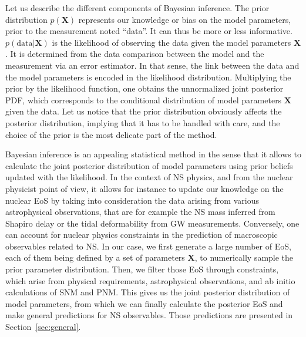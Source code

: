 Let us describe the different components of Bayesian inference. The 
prior distribution $p(\bm{X})$ represents our knowledge or bias on the 
model parameters, prior to the measurement noted ``data''. It can thus be more 
or less informative.
$p(\text{data}|\bm{X})$ is the likelihood of observing the data given the model
parameters $\bm{X}$. It is determined from the data comparison between the 
model and the measurement via an error estimator. In that sense, the link 
between the data and the model parameters is encoded in the likelihood
distribution. 
Multiplying the prior by the likelihood function, one obtains the unnormalized 
joint posterior PDF, which corresponds to the conditional distribution of 
model parameters $\bm{X}$ given the data. Let us notice that the prior 
distribution obviously affects the posterior distribution, implying that it has
to be handled with care, and the choice of the prior is the most delicate part
of the method. 

Bayesian inference is an appealing statistical method in the sense that it 
allows to calculate the joint posterior distribution of model parameters using 
prior beliefs updated with the likelihood. In the context of NS physics, and 
from the nuclear physicist point of view, it allows for instance to update our 
knowledge on the nuclear EoS by taking into consideration the data arising from 
various astrophysical observations, that are for example the NS mass inferred
from Shapiro delay or the tidal deformability from GW measurements.
Conversely, one can account for nuclear physics constraints in the prediction 
of macroscopic observables related to NS. 
In our case, we first generate a large number of EoS, each of them being 
defined by a set of parameters $\bm{X}$, to numerically sample the prior 
parameter distribution. Then, we filter those EoS through constraints, which 
arise from physical requirements, astrophysical observations, and ab initio
calculations of SNM and PNM. This 
gives us the joint posterior distribution of model parameters, from which we 
can finally calculate the posterior EoS and make general predictions for NS 
observables. Those predictions are presented in Section~\ref{sec:general}.

